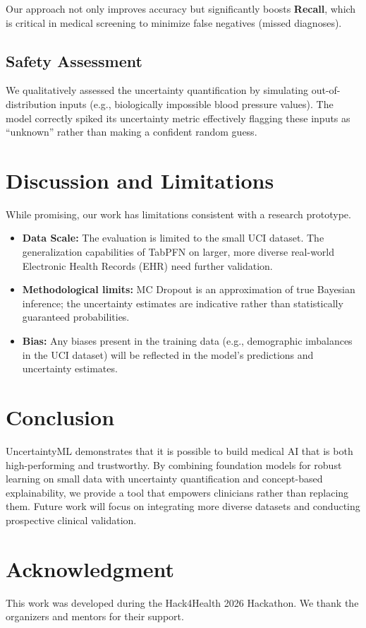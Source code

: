 \documentclass[conference]{IEEEtran}
\begin{document}
Our approach not only improves accuracy but significantly boosts \textbf{Recall}, which is critical in medical screening to minimize false negatives (missed diagnoses).

\subsection{Safety Assessment}
We qualitatively assessed the uncertainty quantification by simulating out-of-distribution inputs (e.g., biologically impossible blood pressure values). The model correctly spiked its uncertainty metric effectively flagging these inputs as ``unknown'' rather than making a confident random guess.

\section{Discussion and Limitations}
While promising, our work has limitations consistent with a research prototype.
\begin{itemize}
    \item \textbf{Data Scale:} The evaluation is limited to the small UCI dataset. The generalization capabilities of TabPFN on larger, more diverse real-world Electronic Health Records (EHR) need further validation.
    \item \textbf{Methodological limits:} MC Dropout is an approximation of true Bayesian inference; the uncertainty estimates are indicative rather than statistically guaranteed probabilities.
    \item \textbf{Bias:} Any biases present in the training data (e.g., demographic imbalances in the UCI dataset) will be reflected in the model's predictions and uncertainty estimates.
\end{itemize}

\section{Conclusion}
UncertaintyML demonstrates that it is possible to build medical AI that is both high-performing and trustworthy. By combining foundation models for robust learning on small data with uncertainty quantification and concept-based explainability, we provide a tool that empowers clinicians rather than replacing them. Future work will focus on integrating more diverse datasets and conducting prospective clinical validation.

\section*{Acknowledgment}
This work was developed during the Hack4Health 2026 Hackathon. We thank the organizers and mentors for their support.
\end{document}
